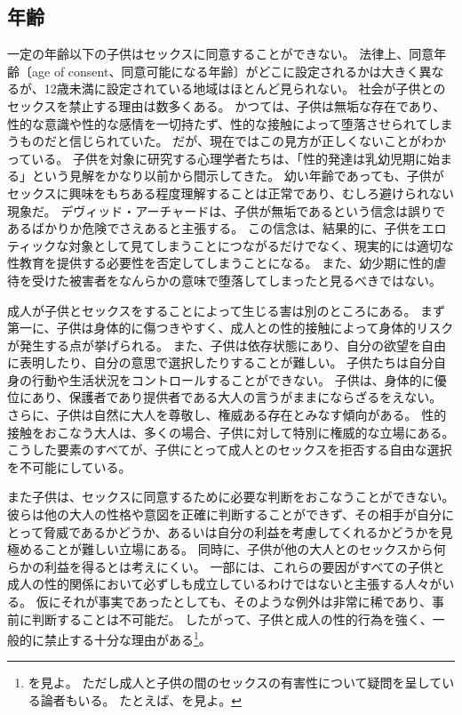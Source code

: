 \documentclass[paper=a4,book,openany]{jlreq}
\begin{document}
\subsection{年齢}

一定の年齢以下の子供はセックスに同意することができない。
法律上、同意年齢〔age of consent、同意可能になる年齢〕がどこに設定されるかは大きく異なるが、12歳未満に設定されている地域はほとんど見られない。
社会が子供とのセックスを禁止する理由は数多くある。
かつては、子供は無垢な存在であり、性的な意識や性的な感情を一切持たず、性的な接触によって堕落させられてしまうものだと信じられていた。
だが、現在ではこの見方が正しくないことがわかっている。
子供を対象に研究する心理学者たちは、「性的発達は乳幼児期に始まる」という見解をかなり以前から間示してきた\citep{louie19:_sexual_behav_child}。
幼い年齢であっても、子供がセックスに興味をもちある程度理解することは正常であり、むしろ避けられない現象だ。
デヴィッド・アーチャードは、子供が無垢であるという信念は誤りであるばかりか危険でさえあると主張する。
この信念は、結果的に、子供をエロティックな対象として見てしまうことにつながるだけでなく、現実的には適切な性教育を提供する必要性を否定してしまうことになる\citep[pp.118--119]{archard98:_sexual_consen}。
また、幼少期に性的虐待を受けた被害者をなんらかの意味で堕落してしまったと見るべきではない。

成人が子供とセックスをすることによって生じる害は別のところにある。
まず第一に、子供は身体的に傷つきやすく、成人との性的接触によって身体的リスクが発生する点が挙げられる。
また、子供は依存状態にあり、自分の欲望を自由に表明したり、自分の意思で選択したりすることが難しい。
子供たちは自分自身の行動や生活状況をコントロールすることができない。
子供は、身体的に優位にあり、保護者であり提供者である大人の言うがままにならざるをえない。
さらに、子供は自然に大人を尊敬し、権威ある存在とみなす傾向がある。
性的接触をおこなう大人は、多くの場合、子供に対して特別に権威的な立場にある。
こうした要素のすべてが、子供にとって成人とのセックスを拒否する自由な選択を不可能にしている。

また子供は、セックスに同意するために必要な判断をおこなうことができない。
彼らは他の大人の性格や意図を正確に判断することができず、その相手が自分にとって脅威であるかどうか、あるいは自分の利益を考慮してくれるかどうかを見極めることが難しい立場にある。
同時に、子供が他の大人とのセックスから何らかの利益を得るとは考えにくい。
一部には、これらの要因がすべての子供と成人の性的関係において必ずしも成立しているわけではないと主張する人々がいる。
仮にそれが事実であったとしても、そのような例外は非常に稀であり、事前に判断することは不可能だ。
したがって、子供と成人の性的行為を強く、一般的に禁止する十分な理由がある\footnote{ \citet{malon15:_adult_child_sex_limit_liber_sexual_moral}を見よ。
ただし成人と子供の間のセックスの有害性について疑問を呈している論者もいる。
たとえば\citet{levine02:_harmf_minor}、\citet{brongersma90:_boy_lover_their_influen_boys}を見よ。}。
\nocite{levine02:_harmf_minor} \nocite{brongersma90:_boy_lover_their_influen_boys}
\end{document}
